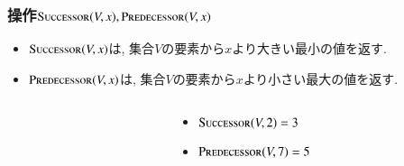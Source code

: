 \documentclass[main]{subfiles}
\begin{document}
\begin{frame}\frametitle{操作$\mathrm{\text{S\textsc{uccessor}}}(V,x), \mathrm{\text{P\textsc{redecessor}}}(V,x)$}
\begin{itemize}
	\item $\mathrm{\text{S\textsc{uccessor}}}(V,x)$は, 集合$V$の要素から$x$より大きい最小の値を返す.\\
	\item $\mathrm{\text{P\textsc{redecessor}}}(V,x)$は, 集合$V$の要素から$x$より小さい最大の値を返す.\\
\end{itemize}

\begin{columns}[c]
	\begin{column}{0.5\linewidth}
		
	\end{column}
	\begin{column}{0.49\linewidth}
		\begin{itemize}
			\item $\mathrm{\text{S\textsc{uccessor}}}(V,2) = 3$\\
			\item $\mathrm{\text{P\textsc{redecessor}}}(V,7) = 5$\\
		\end{itemize}
	\end{column}
\end{columns}
\end{frame}
\end{document}

